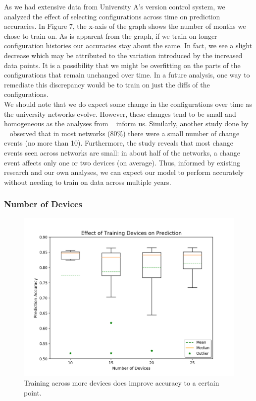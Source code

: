 As we had extensive data from University A's version control system, we analyzed the effect of selecting configurations across time on prediction accuracies. In Figure 7, the x-axis of the graph shows the number of months we chose to train on. As is apparent from the graph, if we train on longer configuration histories our accuracies stay about the same. In fact, we see a slight decrease which may be attributed to the variation introduced by the increased data points. It is a possibility that we might be overfitting on the parts of the configurations that remain unchanged over time. In a future analysis, one way to remediate this discrepancy would be to train on just the diffs of the configurations.\\

We should note that we do expect some change in the configurations over time as the university networks evolve. However, these changes tend to be small and homogeneous as the analyses from ~\cite{Kim} inform us. Similarly, another study done by ~\cite{Gember} observed that in most networks (80\%) there were a small number of change events (no more than 10). Furthermore, the study reveals that most change events seen across networks are small: in about half of the networks, a change event affects only one or two devices (on average). Thus, informed by existing research and our own analyses, we can expect our model to perform accurately without needing to train on data across multiple years.

\subsubsection{Number of Devices}
\begin{figure}[H]
	\centering
	\includegraphics[width=\textwidth]{device_analysis.png}
	\caption{Training across more devices does improve accuracy to a certain point.}
\end{figure}

